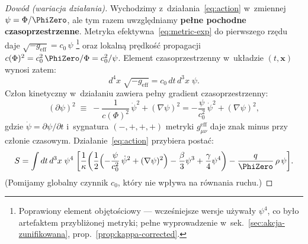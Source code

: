 \begin{proof}[Dow\'od (wariacja dzia\l{}ania)]
Wychodzimy z~dzia\l{}ania~\eqref{eq:action} w~zmiennej
$\psi = \Phi/\PhiZero$, ale tym razem uwzgl\k{e}dniamy
\textbf{pe\l{}ne pochodne czasoprzestrzenne}. Metryka
efektywna~\eqref{eq:metric-exp} do pierwszego rz\k{e}du daje
$\sqrt{-g_{\mathrm{eff}}} = c_0\,\psi$%
\footnote{Poprawiony element obj\k{e}to\'sciowy ---
  wcze\'sniejsze wersje u\.zywa\l{}y $\psi^4$, co by\l{}o
  artefaktem przybli\.zonej metryki; pe\l{}ne wyprowadzenie
  w~sek.~\ref{sec:akcja-zunifikowana}, prop.~\ref{prop:kappa-corrected}.}
oraz lokaln\k{a}
pr\k{e}dko\'s\'c propagacji $c(\Phi)^2 = c_0^2\,\PhiZero/\Phi
= c_0^2/\psi$. Element czasoprzestrzenny w~uk\l{}adzie
$(t, \mathbf{x})$ wynosi zatem:
\[
  d^4x\;\sqrt{-g_{\mathrm{eff}}}
  = c_0\,dt\,d^3x\;\psi.
\]
Cz\l{}on kinetyczny w~dzia\l{}aniu zawiera pe\l{}ny gradient
czasoprzestrzenny:
\begin{equation}\label{eq:kinetic-full}
  (\partial\psi)^2 \;\equiv\;
  -\frac{1}{c(\Phi)^2}\,\dot\psi^2 + (\nabla\psi)^2
  = -\frac{\psi}{c_0^2}\,\dot\psi^2 + (\nabla\psi)^2,
\end{equation}
gdzie $\dot\psi = \partial\psi/\partial t$ i~sygnatura
$(-,+,+,+)$ metryki $g_{\mu\nu}^{\mathrm{eff}}$ daje znak minus
przy cz\l{}onie czasowym. Dzia\l{}anie~\eqref{eq:action} przybiera
posta\'c:
\begin{equation}\label{eq:action-full-psi}
  S = \int dt\,d^3x\;\psi^4\;\biggl[
    \frac{1}{\kappa}\biggl(
      \frac{1}{2}\Bigl(
        -\frac{\psi}{c_0^2}\,\dot\psi^2 + (\nabla\psi)^2
      \Bigr)
      - \frac{\beta}{3}\psi^3 + \frac{\gamma}{4}\psi^4
    \biggr)
    - \frac{q}{\PhiZero}\,\rho\,\psi
  \biggr].
\end{equation}
(Pomijamy globalny czynnik $c_0$, kt\'ory nie wp\l{}ywa na
r\'ownania ruchu.)


\end{proof}

